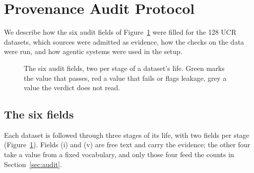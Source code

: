 \section{Provenance Audit Protocol}
\label{app:protocol}

We describe how the six audit fields of Figure~\ref{fig:pipeline} were filled
for the 128 UCR datasets, which sources were admitted as evidence, how the checks on the data were run, and how agentic systems were used in the setup.

\begin{figure}[ht]
  \centering
  
  \caption{The six audit fields, two per stage of a dataset's life. Green marks the value that passes, red a value that fails or flags leakage, grey a value the verdict does not read.}
  \label{fig:pipeline}
\end{figure}

\subsection{The six fields}
\label{app:fields}

Each dataset is followed through three stages of its life, with two fields per stage
(Figure~\ref{fig:pipeline}). Fields (i) and (v) are free text and carry the evidence; the
other four take a value from a fixed vocabulary, and only those four feed the counts in
Section~\ref{sec:audit}.

